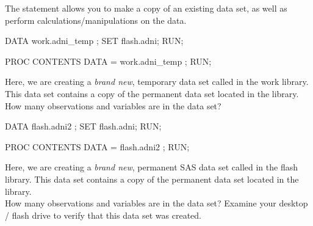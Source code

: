 \begin{frame}[fragile]
The  statement allows you to make a copy of an existing data set, as well as perform calculations/manipulations on the data.
\vskip5pt
\footnotesize
\begin{code}{.0}
DATA work.adni_temp ;
    SET flash.adni;
RUN;

PROC CONTENTS DATA = work.adni_temp ;
RUN;
\end{code}
\emp
\vskip10pt
Here, we are creating a \emph{brand new}, temporary data set called  in the work library.  This data set contains a copy of the permanent  data set located in the  library.  \\
\vskip10pt
\oyo How many observations and variables are in the  data set?
\end{frame}

\begin{frame}[fragile]
\footnotesize
\begin{code}{.0}
DATA flash.adni2 ;
    SET flash.adni;
RUN;

PROC CONTENTS DATA = flash.adni2 ;
RUN;
\end{code}
\emp
\vskip10pt
Here, we are creating a \emph{brand new}, permanent SAS data set called  in the flash library.  This data set contains a copy of the permanent  data set located in the  library.  \\
\vskip10pt
\oyo How many observations and variables are in the  data set?  Examine your desktop / flash drive to verify that this data set was created.
\end{frame}


